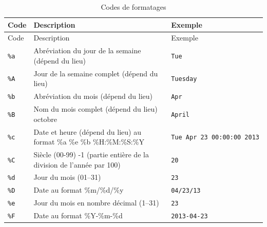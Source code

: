 \documentclass[
  12pt,
]{book}
\numberwithin{equation}{section}
\numberwithin{countremarque}{section}
\begin{document}
\begin{longtable}[]{@{}
  >{\raggedleft\arraybackslash}p{}
  >{\raggedleft\arraybackslash}p{}
  >{\raggedleft\arraybackslash}p{}@{}}
\caption{\label{tab:codes-formatage} Codes de formatages}\tabularnewline
\toprule\noalign{}
\begin{minipage}[b]{\linewidth}\raggedleft
Code
\end{minipage} & \begin{minipage}[b]{\linewidth}\raggedleft
Description
\end{minipage} & \begin{minipage}[b]{\linewidth}\raggedleft
Exemple
\end{minipage} \\
\midrule\noalign{}
\endfirsthead
\toprule\noalign{}
\begin{minipage}[b]{\linewidth}\raggedleft
Code
\end{minipage} & \begin{minipage}[b]{\linewidth}\raggedleft
Description
\end{minipage} & \begin{minipage}[b]{\linewidth}\raggedleft
Exemple
\end{minipage} \\
\midrule\noalign{}
\endhead
\bottomrule\noalign{}
\endlastfoot
\texttt{\%a} & Abréviation du jour de la semaine (dépend du lieu) & \texttt{Tue} \\
\texttt{\%A} & Jour de la semaine complet (dépend du lieu) & \texttt{Tuesday} \\
\texttt{\%b} & Abréviation du mois (dépend du lieu) & \texttt{Apr} \\
\texttt{\%B} & Nom du mois complet (dépend du lieu) octobre & \texttt{April} \\
\texttt{\%c} & Date et heure (dépend du lieu) au format \%a \%e \%b \%H:\%M:\%S:\%Y & \texttt{Tue\ Apr\ 23\ 00:00:00\ 2013} \\
\texttt{\%C} & Siècle (00-99) -1 (partie entière de la division de l'année par 100) & \texttt{20} \\
\texttt{\%d} & Jour du mois (01--31) & \texttt{23} \\
\texttt{\%D} & Date au format \%m/\%d/\%y & \texttt{04/23/13} \\
\texttt{\%e} & Jour du mois en nombre décimal (1--31) & \texttt{23} \\
\texttt{\%F} & Date au format \%Y-\%m-\%d & \texttt{2013-04-23} \\

\end{longtable}
\end{document}
